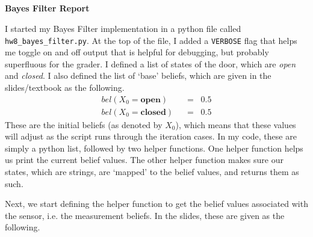 \documentclass[12pt]{article}
\title{
    \vspace{2in}
    \textmd{\textbf{\hmwkClass\ \hmwkTitle}}\\
    \vspace{3in}
}
\author{\hmwkAuthorName}
\date{}
\begin{document}
\maketitle

\pagebreak

\begin{center}
    \large\textbf{Bayes Filter Report}
\end{center}
I started my Bayes Filter implementation in a python file called
\lstinline{hw8_bayes_filter.py}. At the top of the file, I added a \lstinline{VERBOSE}
flag that helps me toggle on and off output that is helpful for debugging, but
probably superfluous for the grader. I defined a list of states of the door,
which are \textit{open} and \textit{closed}. I also defined the list of 
`base' beliefs, which
are given in the slides/textbook as the following.
\begin{align*}
    bel(X_0 = \mathbf{open})\;\; &=\;\; 0.5\\
    bel(X_0 = \mathbf{closed})\;\; &=\;\; 0.5
\end{align*}
These are the initial beliefs (as denoted by $X_0$), which means that these values
will adjust as the script runs through the iteration cases. In my code, these are
simply a python list, followed by two helper functions. One helper function helps
us print the current belief values.
The other helper function makes sure our states, which are strings, are `mapped'
to the belief values, and returns them as such.

\vspace{0.1in}
Next, we start defining the helper function to get the belief values associated
with the sensor, i.e. the measurement beliefs. In the slides, these are given
as the following.

\end{document}
